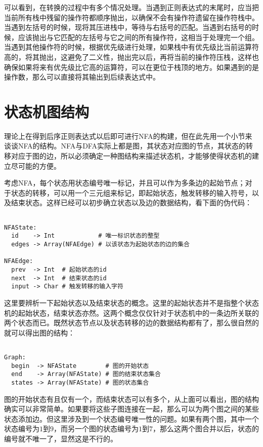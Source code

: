 可以看到，在转换的过程中有多个情况处理。当遇到正则表达式的末尾时，应当把当前所有栈中残留的操作符都顺序抛出，以确保不会有操作符遗留在操作符栈中。当遇到左括号的时候，现将其压进栈中，等待与右括号的匹配。当遇到右括号的时候，应该抛出与它匹配的左括号与它之间的所有操作符，这相当于处理完一个组。当遇到其他操作符的时候，根据优先级进行处理，如果栈中有优先级比当前运算符高的，将其抛出，这避免了二义性，抛出完以后，再将当前的操作符压栈，这样也确保如果将来有优先级比它高的运算符，可以在更位于栈顶的地方。如果遇到的是操作数，那么可以直接将其输出到后续表达式中。


\section{状态机图结构}

理论上在得到后序正则表达式以后即可进行NFA的构建，但在此先用一个小节来谈谈NFA的结构。NFA与DFA实际上都是图，其状态对应图的节点，其状态的转移对应于图的边，所以必须确定一种图结构来描述状态机，才能够使得状态机的建立尽可能的方便。

考虑NFA，每个状态用状态编号唯一标记，并且可以作为多条边的起始节点；对于状态的转移，可以用一个三元组来标记，即起始状态，触发转移的输入符号，以及结束状态。这样已经可以初步确立状态以及边的数据结构，看下面的伪代码：

\begin{verbatim}

NFAState:
  id    -> Int            # 唯一标识状态的整型
  edges -> Array(NFAEdge) # 以该状态为起始状态的边的集合

NFAEdge:
  prev  -> Int  # 起始状态的id
  next  -> Int  # 结束状态的id
  input -> Char # 触发转移的输入字符

\end{verbatim}

这里要辨析一下起始状态以及结束状态的概念。这里的起始状态并不是指整个状态机的起始状态，结束状态亦然。这两个概念仅仅针对于状态机中的一条边所关联的两个状态而已。既然状态节点以及状态转移的边的数据结构都有了，那么很自然的就可以得出图的结构：

\begin{verbatim}

Graph:
  begin  -> NFAState        # 图的开始状态
  end    -> Array(NFAState) # 图的结束状态集合
  states -> Array(NFAState) # 图的状态集合

\end{verbatim}

图的开始状态有且仅有一个，而结束状态可以有多个，从上面可以看出，图的结构确实可以非常简单。如果要将这些子图连接在一起，那么可以为两个图之间的某些状态添加边。但这里涉及到一个状态编号唯一性的问题。如果有两个图，其中一个状态编号为$1$到$9$，而另一个图的状态编号为$1$到$7$，那么这两个图合并以后，状态的编号就不唯一了，显然这是不行的。


